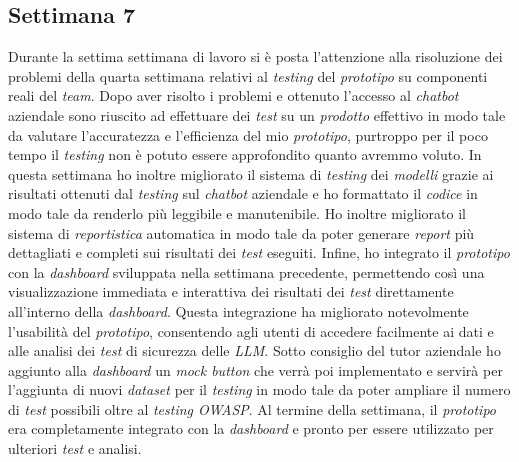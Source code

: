 \subsection{Settimana 7}
Durante la settima settimana di lavoro si è posta l'attenzione alla risoluzione dei problemi della quarta settimana relativi al \emph{testing} del \emph{prototipo} su componenti reali del \emph{team}. Dopo aver risolto i problemi e ottenuto l'accesso al \emph{chatbot} aziendale sono riuscito ad effettuare dei \emph{test} su un \emph{prodotto} effettivo in modo tale da valutare l'accuratezza e l'efficienza del mio \emph{prototipo}, purtroppo per il poco tempo il \emph{testing} non è potuto essere approfondito quanto avremmo voluto. In questa settimana ho inoltre migliorato il sistema di \emph{testing} dei \emph{modelli} grazie ai risultati ottenuti dal \emph{testing} sul \emph{chatbot} aziendale e ho formattato il \emph{codice} in modo tale da renderlo più leggibile e manutenibile. Ho inoltre migliorato il sistema di \emph{reportistica} automatica in modo tale da poter generare \emph{report} più dettagliati e completi sui risultati dei \emph{test} eseguiti. Infine, ho integrato il \emph{prototipo} con la \emph{dashboard} sviluppata nella settimana precedente, permettendo così una visualizzazione immediata e interattiva dei risultati dei \emph{test} direttamente all'interno della \emph{dashboard}. Questa integrazione ha migliorato notevolmente l'usabilità del \emph{prototipo}, consentendo agli utenti di accedere facilmente ai dati e alle analisi dei \emph{test} di sicurezza delle \emph{LLM}. Sotto consiglio del tutor aziendale ho aggiunto alla \emph{dashboard} un \emph{mock button} che verrà poi implementato e servirà per l'aggiunta di nuovi \emph{dataset} per il \emph{testing} in modo tale da poter ampliare il numero di \emph{test} possibili oltre al \emph{testing OWASP}. Al termine della settimana, il \emph{prototipo} era completamente integrato con la \emph{dashboard} e pronto per essere utilizzato per ulteriori \emph{test} e analisi.

